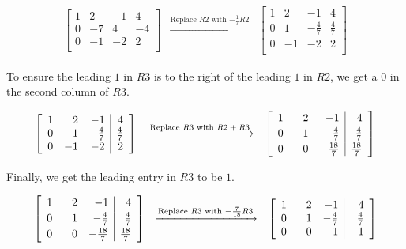 \documentclass{ximera}
\begin{document}
\begin{example}
\[\begin{array}{ccc}
\left[ \begin{array}{rrr|r}  
1 & 2 & -1 & 4 \\  
0 & -7 & 4 & -4 \\ 
0 & -1 & -2  & 2 \\ 
\end{array} \right]  
& 
\xrightarrow{\text{Replace $R2$ with $-\frac{1}{7}R2$}}  
& 
\left[ \begin{array}{rrr|r} 
1 & 2 & -1 & 4 \\ 
0 & 1 & -\frac{4}{7} & \frac{4}{7} \\ 
0 & -1 & -2 & 2 \\
\end{array} \right]

\end{array}\]

To ensure the leading $1$ in $R3$ is to the right of the leading $1$ in $R2$, we get a $0$ in the second column of $R3$.

\[ \begin{array}{ccc}

\left[ \begin{array}{rrr|r} 
1 & 2 & -1 & 4 \\ 
0 & 1 & -\frac{4}{7} & \frac{4}{7} \\ 
0 & -1 & -2 & 2 \\ 
\end{array} \right]  
& 
\xrightarrow{\text{Replace $R3$ with $R2+R3$}} 
&  
\left[ \begin{array}{rrr|r} 
1 & \hphantom{-}2 & -1 & 4 \\ [2pt]
0 & 1 & -\frac{4}{7} & \frac{4}{7} \\ [2pt]
0 & 0 & -\frac{18}{7} & \frac{18}{7} \\ 
\end{array} \right]


\end{array}\]

Finally, we get the leading entry in $R3$ to be $1$.

\[\begin{array}{ccc}

\left[ \begin{array}{rrr|r} 
1 & \hphantom{-}2 & -1 & 4 \\ [2pt]
0 & 1 & -\frac{4}{7} & \frac{4}{7} \\ [2pt]
0 & 0 & -\frac{18}{7} & \frac{18}{7} \\ 
\end{array} \right]   
& 
\xrightarrow{\text{Replace $R3$ with $-\frac{7}{18}R3$}} 
& 
\left[ \begin{array}{rrr|r} 
1 & \hphantom{-}2 & -1 & 4 \\ 
0 & 1 & -\frac{4}{7} & \frac{4}{7} \\ 
0 & 0 &1 & -1 \\ 
\end{array} \right]


\end{array}\]
\end{example}
\end{document}
